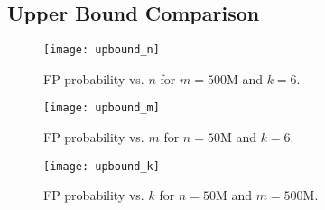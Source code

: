 \subsection{Upper Bound Comparison}


\begin{figure*}[t!]
	\vspace{0.1in}
	\centering
	\begin{minipage}[t]{0.32\textwidth}{
			\prefig
			\texttt{[image: upbound\_n]}}
		\postfig\precaption\adjustfigs
		\caption{FP probability vs. $n$ for $m = 500$M and $k = 6$.}
		\label{upbound_n}\postcaption
	\end{minipage}
	\begin{minipage}[t]{0.32\textwidth}{
			\prefig
			\vspace{0.02in}
			\texttt{[image: upbound\_m]}}
			\vspace{-0.02in}
		\postfig\precaption\adjustfigs
		\caption{FP probability vs. $m$ for $n = 50$M and $k = 6$.}
		\label{upbound_m}\postcaption
	\end{minipage}
	\begin{minipage}[t]{0.32\textwidth}{
			\prefig
			\texttt{[image: upbound\_k]}}
		\postfig\precaption\adjustfigs
		\caption{FP probability vs. $k$ for $n = 50$M and $m = 500$M.}
		\label{upbound_k}\postcaption
	\end{minipage}
\end{figure*}

